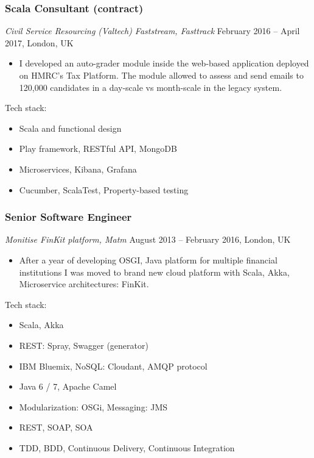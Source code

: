 \documentclass[]{rss}
\providecommand{\tightlist}{%
  \setlength{\itemsep}{0pt}\setlength{\parskip}{0pt}}
\begin{document}
\begin{resume}
\subsubsection{Scala Consultant
(contract)}\label{scala-consultant-contract}

\emph{Civil Service Resourcing (Valtech) \textbar{} Faststream,
Fasttrack} February 2016 -- April 2017, London, UK

\begin{itemize}
\tightlist
\item
  I developed an auto-grader module inside the web-based application
  deployed on HMRC's Tax Platform. The module allowed to assess and send
  emails to 120,000 candidates in a day-scale vs month-scale in the
  legacy system.
\end{itemize}

Tech stack:

\begin{itemize}
\tightlist
\item
  Scala and functional design
\item
  Play framework, RESTful API, MongoDB
\item
  Microservices, Kibana, Grafana
\item
  Cucumber, ScalaTest, Property-based testing
\end{itemize}

\subsubsection{Senior Software Engineer}\label{senior-software-engineer}

\emph{Monitise \textbar{} FinKit platform, Matm} August 2013 -- February
2016, London, UK

\begin{itemize}
\tightlist
\item
  After a year of developing OSGI, Java platform for multiple financial
  institutions I was moved to brand new cloud platform with Scala, Akka,
  Microservice architectures: FinKit.
\end{itemize}

Tech stack:

\begin{itemize}
\tightlist
\item
  Scala, Akka
\item
  REST: Spray, Swagger (generator)
\item
  IBM Bluemix, NoSQL: Cloudant, AMQP protocol
\item
  Java 6 / 7, Apache Camel
\item
  Modularization: OSGi, Messaging: JMS
\item
  REST, SOAP, SOA
\item
  TDD, BDD, Continuous Delivery, Continuous Integration
\end{itemize}


\end{resume}
\end{document}
